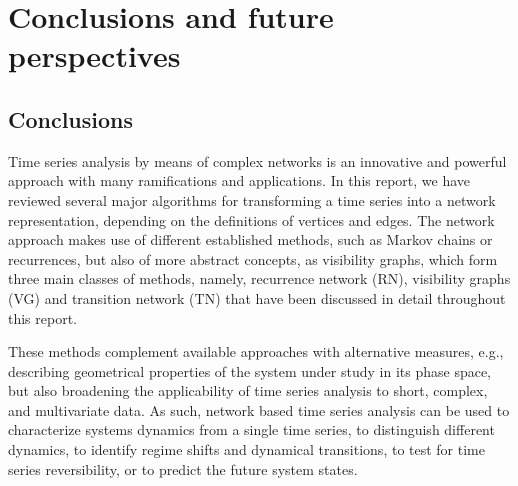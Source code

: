 \section{Conclusions and future perspectives} \label{sec:Discussion}

	\subsection{Conclusions}
Time series analysis by means of complex networks is an innovative and powerful
approach with many ramifications and applications. In this report, we have reviewed several major algorithms for transforming a time series into a network representation, depending on the definitions of vertices and edges. The network approach makes use of different established methods, such as Markov chains or recurrences, but also of more abstract concepts, as visibility graphs, which form three main classes of methods, namely, recurrence network (RN), visibility graphs (VG) and transition network (TN) that have been discussed in detail throughout this report.


These methods complement available approaches with alternative measures, e.g., describing geometrical properties of the system under study in its phase space, but also broadening the applicability of time series analysis to short, complex, and multivariate data. As such, network based time series analysis can be used to characterize systems dynamics from a single time series, to distinguish different dynamics, to identify regime shifts and dynamical transitions, to test for time series reversibility, or to predict the future system states.

%
%
%
%
%

